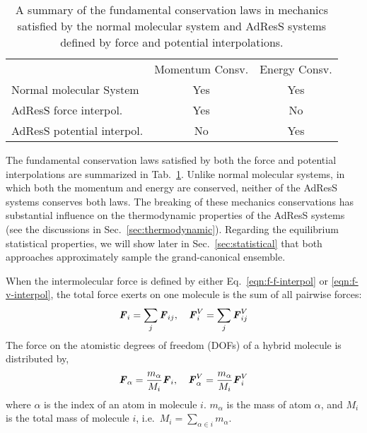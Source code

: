 \documentclass[epjST]{svjour}
\newcommand{\vect}[1]{\textbf{\textit{#1}}}
\newcommand{\moleidxone}[0]{i}
\newcommand{\moleidxtwo}[0]{j}
\newcommand{\atomidxone}[0]{\alpha}
\begin{document}
\begin{table}
  \centering
  \caption{A summary of the fundamental conservation laws in mechanics 
    satisfied by the normal molecular system and AdResS systems defined by force and potential interpolations.}
  \label{tab:conv-laws}
  \begin{tabular*}{0.8\textwidth}{@{\extracolsep{\fill}}lcc}\hline\hline
    &         Momentum Consv.     &       Energy Consv. \\
    Normal molecular System     &       {Yes}        &       {Yes}\\      
    AdResS force interpol.   &       {Yes}        &       {No}\\      
    AdResS potential interpol.  &     {No}  &       {Yes}\\\hline\hline
  \end{tabular*}
\end{table}
The fundamental conservation laws satisfied by both the force and potential interpolations
are summarized in Tab.~\ref{tab:conv-laws}. Unlike normal molecular systems, in which both
the momentum and energy are conserved, neither of the AdResS systems conserves
both laws. The breaking of these mechanics conservations has substantial influence on the thermodynamic
properties of the AdResS systems (see the discussions in Sec.~\ref{sec:thermodynamic}).
Regarding the equilibrium statistical properties, we will show later in Sec.~\ref{sec:statistical}
that both approaches approximately sample the grand-canonical ensemble.

When the intermolecular force is defined by either
Eq.~\eqref{eqn:f-f-interpol} or \eqref{eqn:f-v-interpol}, the total
force exerts on one molecule is the sum of all pairwise forces:
\begin{align}
  \vect F_\moleidxone = \sum_\moleidxtwo \vect F_{\moleidxone\moleidxtwo}, \quad \vect F^V_\moleidxone = \sum_\moleidxtwo \vect F^V_{\moleidxone\moleidxtwo}
\end{align}
The force on the atomistic degrees of freedom (DOFs) of a hybrid molecule is distributed 
by, 
\begin{align}
  \vect F_\atomidxone = \frac{m_\atomidxone}{M_\moleidxone}\vect F_\moleidxone, \quad   \vect F^V_\atomidxone = \frac{m_\atomidxone}{M_\moleidxone}\vect F^V_\moleidxone 
\end{align}
where  $\atomidxone$ is the index of an atom in molecule $\moleidxone$.
$m_\atomidxone$ is the mass of atom $\alpha$, and $M_\moleidxone$ is the total mass of molecule $\moleidxone$, i.e.~$M_\moleidxone = \sum_{\atomidxone\in\moleidxone}m_\atomidxone$.
\end{document}

